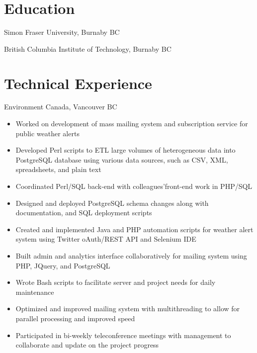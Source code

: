 \documentclass{ik-resume}
\begin{document}
\section{Education}


Simon Fraser University, Burnaby BC


British Columbia Institute of Technology, Burnaby BC


\section{Technical Experience}


Environment Canada, Vancouver BC

\begin{itemize}
  \itemsep0em
  \item Worked on development of mass mailing system and subscription service for public weather alerts
  \item Developed Perl scripts to ETL large volumes of heterogeneous data into PostgreSQL database using various data sources, such as CSV, XML, spreadsheets, and plain text
  \item Coordinated Perl/SQL back-end with colleagues'front-end work in PHP/SQL
  \item Designed and deployed PostgreSQL schema changes along with documentation, and SQL deployment scripts
  \item Created and implemented Java and PHP automation scripts for weather alert system using Twitter oAuth/REST API and Selenium IDE
  \item Built admin and analytics interface collaboratively for mailing system using PHP, JQuery, and PostgreSQL
  \item Wrote Bash scripts to facilitate server and project needs for daily maintenance
  \item Optimized and improved mailing system with multithreading to allow for parallel processing and improved speed
  \item Participated in bi-weekly teleconference meetings with management to collaborate and update on the project progress
\end{itemize}
\end{document}
